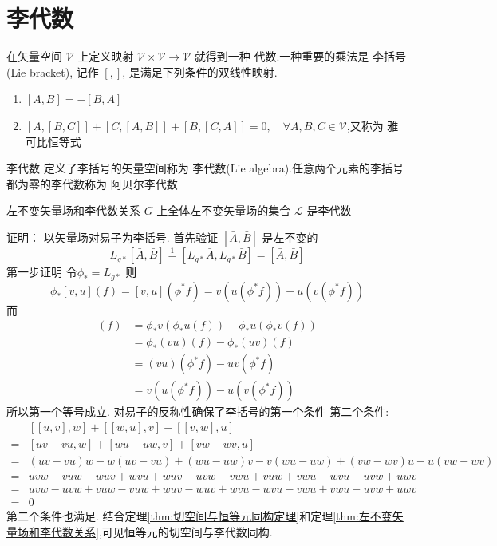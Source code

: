 \documentclass[../main.tex]{subfiles}
\begin{document}
\chapter{李代数}
在矢量空间 $\mathscr{V}$ 上定义映射 $\mathscr{V}\times \mathscr{V}\rightarrow \mathscr{V}$ 就得到一种 代数.一种重要的乘法是 李括号(Lie bracket), 记作 $[,]$, 是满足下列条件的双线性映射.
\begin{enumerate}
    \item $[A,B]= -[B,A]$
    \item $[A,[B,C]] + [C,[A,B]]+[B,[C,A]] =0,\quad \forall A,B,C\in\mathscr{V}$,又称为 雅可比恒等式
\end{enumerate}
\begin{definition}{}{李代数}
    定义了李括号的矢量空间称为 李代数(Lie algebra).任意两个元素的李括号都为零的李代数称为 阿贝尔李代数
\end{definition}
\begin{theorem}{}{左不变矢量场和李代数关系}
     $G$ 上全体左不变矢量场的集合 $\mathscr{L}$ 是李代数
\end{theorem}
证明： 以矢量场对易子为李括号.
首先验证 $[\bar{A},\bar{B}]$ 是左不变的
    $$ L_{g*}[\bar{A},\bar{B}] \stackrel{1}{=} [L_{g*}\bar{A}, L_{g*}\bar{B}] = [\bar{A},\bar{B}]$$
    第一步证明
    令$\phi_* = L_{g*}$ 
    则$$\phi_*[v,u](f) = [v,u](\phi^*f) = v(u(\phi^*f)) - u(v(\phi^*f))$$
    而\begin{align*}
        [\phi_*v,\phi_*u](f) &= \phi_*v(\phi_*u(f)) - \phi_*u(\phi_*v(f))\\
        &= \phi_*(vu)(f) - \phi_*(uv)(f) \\
        &=(vu)(\phi^*f) - uv(\phi^*f) \\
        &=v(u(\phi^*f)) - u(v(\phi^*f))
    \end{align*}
    所以第一个等号成立.
    对易子的反称性确保了李括号的第一个条件
    第二个条件:
    \begin{align*}
        &[[u,v],w] + [[w,u],v]+[[v,w],u]\\
       =&[uv-vu,w] + [wu-uw,v]+[vw-wv,u]\\
       =&(uv-vu)w-w(uv-vu) + (wu-uw)v-v(wu-uw)+(vw-wv)u-u(vw-wv)\\
       =&uvw-vuw-wuv+wvu +wuv - uvw -vwu+vuw + vwu-wvu -uvw+uwv\\ 
       =&uvw-uvw+vuw-vuw+wuv-wuv+wvu-wvu-vwu+vwu-uvw+uwv\\ 
       =&0
    \end{align*}
    第二个条件也满足.
    结合定理\ref{thm:切空间与恒等元同构定理}和定理\ref{thm:左不变矢量场和李代数关系},可见恒等元的切空间与李代数同构.
\end{document}
